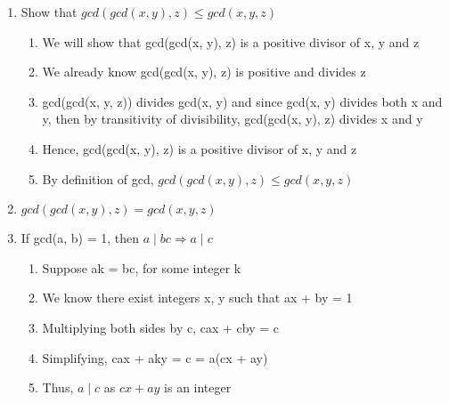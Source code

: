 \documentclass{article}
\begin{document}
\begin{enumerate}
\item Show that $ gcd(gcd(x, y), z) \leq gcd(x, y, z) $
\begin{enumerate}
\item We will show that gcd(gcd(x, y), z) is a positive divisor of x, y and z
\item We already know gcd(gcd(x, y), z) is positive and divides z
\item gcd(gcd(x, y, z)) divides gcd(x, y) and since gcd(x, y) divides both x and
y, then by transitivity of divisibility, gcd(gcd(x, y), z) divides x and y
\item Hence, gcd(gcd(x, y), z) is a positive divisor of x, y and z
\item By definition of gcd, $ gcd(gcd(x, y), z) \leq gcd(x, y, z) $
\end{enumerate}

\item $ gcd(gcd(x, y), z) = gcd(x, y, z) $

\item If gcd(a, b) = 1, then $ a \mid bc \Rightarrow a \mid c $
\begin{enumerate}
\item Suppose ak = bc, for some integer k
\item We know there exist integers x, y such that ax + by = 1
\item Multiplying both sides by c, cax + cby = c
\item Simplifying, cax + aky = c = a(cx + ay)
\item Thus, $ a \mid c $ as $ cx + ay $ is an integer 
\end{enumerate}

\end{enumerate}
\end{document}
